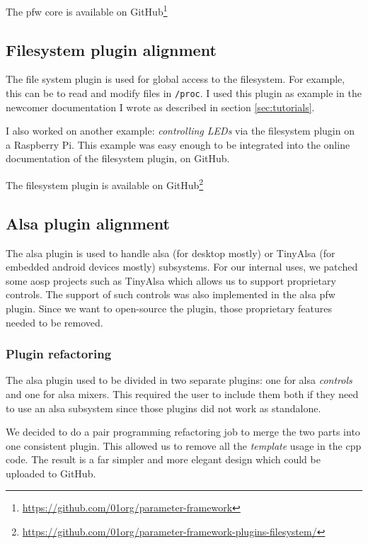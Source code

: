 The \gls{pfw} core is available on \gls{GitHub}\footnote{\url{https://github.com/01org/parameter-framework}}

\subsection{Filesystem plugin alignment}

The file system plugin is used for global access to the filesystem. For example, this can be to
read and modify files in \lstinline{/proc}. I used this plugin as example in the newcomer
documentation I wrote as described in section \ref{sec:tutorials}.

I also worked on another example: \emph{controlling LEDs} via the filesystem
plugin on a Raspberry Pi.  This example was easy enough to be integrated into
the online documentation of the filesystem plugin, on \gls{GitHub}.

The filesystem plugin is available on \gls{GitHub}\footnote{\url{https://github.com/01org/parameter-framework-plugins-filesystem/}}

\subsection{Alsa plugin alignment}

The \gls{alsa} plugin is used to handle \gls{alsa} (for desktop mostly) or TinyAlsa (for embedded \gls{android} devices mostly) subsystems.
For our internal uses, we patched some \gls{aosp} projects such as TinyAlsa which allows us to support proprietary controls.
The support of such controls was also implemented in the \gls{alsa} \gls{pfw} plugin. Since
we want to open-source the plugin, those proprietary features needed to be removed.

\subsubsection{Plugin refactoring}
The \gls{alsa} plugin used to be divided in two separate plugins: one for \gls{alsa} \emph{controls} and one for \gls{alsa} mixers.
This required the user to include them both if they need to use an \gls{alsa} subsystem since those plugins did not work as
standalone.

We decided to do a pair programming refactoring job to merge the two parts into one consistent plugin.
This allowed us to remove all the \emph{template} usage in the \gls{cpp} code.
The result is a far simpler and more elegant design which could be uploaded to \gls{GitHub}.

